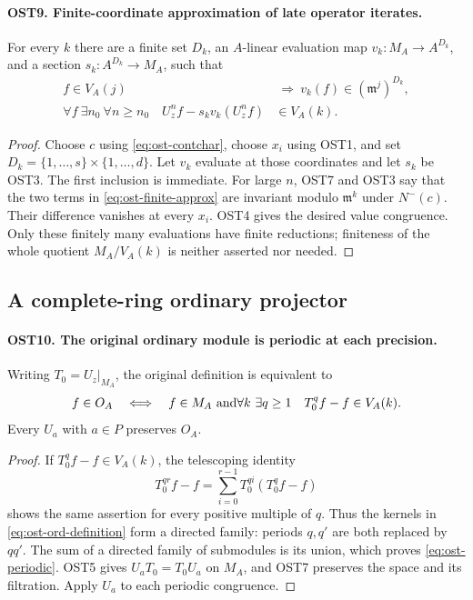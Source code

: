 \documentclass[11pt,a4paper]{article}
\numberwithin{equation}{section}
\theoremstyle{remark}\newtheorem{remark}[theorem]{Remark}
\begin{document}
\paragraph{OST9. Finite-coordinate approximation of late operator iterates.}
\label{claim:OST9}
For every $k$ there are a finite set $D_k$, an $A$-linear
evaluation map $v_k:M_A\to A^{D_k}$, and a section
$s_k:A^{D_k}\to M_A$, such that
\begin{align}
 f\in V_A(j)&\ \Longrightarrow\ v_k(f)\in(\mathfrak m^j)^{D_k},
 \label{eq:ost-evaluation-filtration}\\
 \forall f\ \exists n_0\ \forall n\geq n_0\quad
 U_z^nf-s_kv_k(U_z^nf)&\in V_A(k).
 \label{eq:ost-finite-approx}
\end{align}
\begin{proof}
Choose $c$ using \eqref{eq:ost-contchar}, choose $x_i$ using
OST1, and set $D_k=\{1,\ldots,\allowbreak{} s\}\times\{1,\ldots,\allowbreak{} d\}$.
Let $v_k$ evaluate at those coordinates and let $s_k$ be OST3.
The first inclusion is immediate.  For large $n$, OST7 and
OST3 say that the two terms in \eqref{eq:ost-finite-approx}
are invariant modulo $\mathfrak m^k$ under $N^-(c)$.
Their difference vanishes at every $x_i$.  OST4 gives the
desired value congruence.  Only these finitely many evaluations
have finite reductions; finiteness of the whole quotient
$M_A/V_A(k)$ is neither asserted nor needed.
\end{proof}

\subsection{A complete-ring ordinary projector}

\paragraph{OST10. The original ordinary module is periodic at each precision.}
\label{claim:OST10}
Writing $T_0=U_z|_{M_A}$, the original definition is equivalent to
\begin{equation}\label{eq:ost-periodic}
 f\in O_A\quad\Longleftrightarrow\quad
 f\in M_A\ \hbox{and}
 \forall k\ \exists q\geq1\quad T_0^qf-f\in V_A(k).
\end{equation}
Every $U_a$ with $a\in P$ preserves $O_A$.
\begin{proof}
If $T_0^qf-f\in V_A(k)$, the telescoping identity
\[
 T_0^{qr}f-f=\sum_{i=0}^{r-1}T_0^{qi}(T_0^qf-f)
\]
shows the same assertion for every positive multiple of $q$.
Thus the kernels in \eqref{eq:ost-ord-definition} form a
directed family: periods $q,\allowbreak{} q'$ are both replaced by $qq'$.
The sum of a directed family of submodules is its union,
which proves \eqref{eq:ost-periodic}.  OST5 gives
$U_aT_0=T_0U_a$ on $M_A$, and OST7 preserves the space and
its filtration.  Apply $U_a$ to each periodic congruence.
\end{proof}
\end{document}
